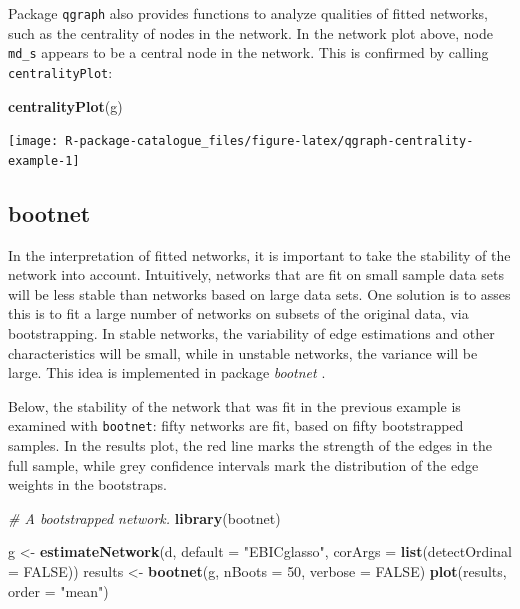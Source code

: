 \documentclass[]{book}
\newenvironment{Shaded}{\begin{snugshade}}{\end{snugshade}}
\newcommand{\KeywordTok}[1]{\textcolor[rgb]{0.13,0.29,0.53}{\textbf{#1}}}
\newcommand{\DataTypeTok}[1]{\textcolor[rgb]{0.13,0.29,0.53}{#1}}
\newcommand{\DecValTok}[1]{\textcolor[rgb]{0.00,0.00,0.81}{#1}}
\newcommand{\StringTok}[1]{\textcolor[rgb]{0.31,0.60,0.02}{#1}}
\newcommand{\CommentTok}[1]{\textcolor[rgb]{0.56,0.35,0.01}{\textit{#1}}}
\newcommand{\OtherTok}[1]{\textcolor[rgb]{0.56,0.35,0.01}{#1}}
\newcommand{\NormalTok}[1]{#1}
\begin{document}
Package \texttt{qgraph} also provides functions to analyze qualities of
fitted networks, such as the centrality of nodes in the network. In the
network plot above, node \texttt{md\_s} appears to be a central node in
the network. This is confirmed by calling \texttt{centralityPlot}:

\begin{Shaded}
\begin{Highlighting}[]
\KeywordTok{centralityPlot}\NormalTok{(g)}
\end{Highlighting}
\end{Shaded}

\begin{center}\texttt{[image: R-package-catalogue\_files/figure-latex/qgraph-centrality-example-1]} \end{center}

\subsection{bootnet}\label{bootnet}


In the interpretation of fitted networks, it is important to take the
stability of the network into account. Intuitively, networks that are
fit on small sample data sets will be less stable than networks based on
large data sets. One solution is to asses this is to fit a large number
of networks on subsets of the original data, via bootstrapping. In
stable networks, the variability of edge estimations and other
characteristics will be small, while in unstable networks, the variance
will be large. This idea is implemented in package \emph{bootnet}
\citep{Epskamp2018a}.

Below, the stability of the network that was fit in the previous example
is examined with \texttt{bootnet}: fifty networks are fit, based on
fifty bootstrapped samples. In the results plot, the red line marks the
strength of the edges in the full sample, while grey confidence
intervals mark the distribution of the edge weights in the bootstraps.

\begin{Shaded}
\begin{Highlighting}[]
\CommentTok{# A bootstrapped network. }
\KeywordTok{library}\NormalTok{(bootnet)}

\NormalTok{g <-}\StringTok{ }\KeywordTok{estimateNetwork}\NormalTok{(d, }\DataTypeTok{default =} \StringTok{"EBICglasso"}\NormalTok{,}
                     \DataTypeTok{corArgs =} \KeywordTok{list}\NormalTok{(}\DataTypeTok{detectOrdinal =} \OtherTok{FALSE}\NormalTok{))}
\NormalTok{results <-}\StringTok{ }\KeywordTok{bootnet}\NormalTok{(g, }\DataTypeTok{nBoots =} \DecValTok{50}\NormalTok{, }\DataTypeTok{verbose =} \OtherTok{FALSE}\NormalTok{)}
\KeywordTok{plot}\NormalTok{(results, }\DataTypeTok{order =} \StringTok{"mean"}\NormalTok{)}
\end{Highlighting}
\end{Shaded}
\end{document}
